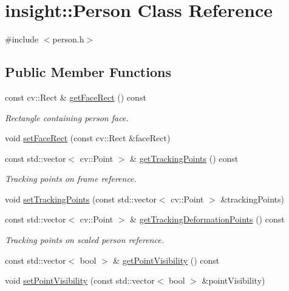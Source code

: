 \hypertarget{classinsight_1_1Person}{}\section{insight\+:\+:Person Class Reference}
\label{classinsight_1_1Person}


{\ttfamily \#include $<$person.\+h$>$}

\subsection*{Public Member Functions}
\begin{DoxyCompactItemize}
\item 
const cv\+::\+Rect \& \hyperlink{classinsight_1_1Person_a57d7a32a780bdd2cb961bbb9fdc2db6a}{get\+Face\+Rect} () const 
\begin{DoxyCompactList}\small\item\em Rectangle containing person face. \end{DoxyCompactList}\item 
void \hyperlink{classinsight_1_1Person_ad182c6fbd2b608c77b100182e02cf30e}{set\+Face\+Rect} (const cv\+::\+Rect \&face\+Rect)
\item 
const std\+::vector$<$ cv\+::\+Point $>$ \& \hyperlink{classinsight_1_1Person_a9ead9b7768710e250dcb04d9d12e7401}{get\+Tracking\+Points} () const 
\begin{DoxyCompactList}\small\item\em Tracking points on frame reference. \end{DoxyCompactList}\item 
void \hyperlink{classinsight_1_1Person_a9c668ee6eb33db866cf8bcd755b14767}{set\+Tracking\+Points} (const std\+::vector$<$ cv\+::\+Point $>$ \&tracking\+Points)
\item 
const std\+::vector$<$ cv\+::\+Point $>$ \& \hyperlink{classinsight_1_1Person_ac11e159bd50afbb5683693a91bf3b96b}{get\+Tracking\+Deformation\+Points} () const 
\begin{DoxyCompactList}\small\item\em Tracking points on scaled person reference. \end{DoxyCompactList}\item 
const std\+::vector$<$ bool $>$ \& \hyperlink{classinsight_1_1Person_acc699b992cfd2bd744dba52208156f49}{get\+Point\+Visibility} () const 
\item 
void \hyperlink{classinsight_1_1Person_aa4408d90ce0a5bc406451fb2c306d1d7}{set\+Point\+Visibility} (const std\+::vector$<$ bool $>$ \&point\+Visibility)

\end{DoxyCompactItemize}

